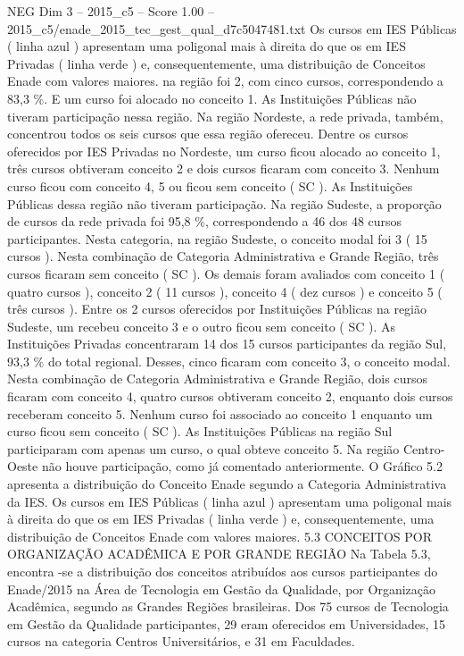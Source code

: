 \begin{textsample}{NEG Dim 3 – 2015\_c5 – Score 1.00 – 2015\_c5/enade\_2015\_tec\_gest\_qual\_d7c5047481.txt}
Os cursos em IES Públicas ( linha azul ) apresentam uma poligonal mais à direita do que os em IES Privadas ( linha verde ) e, consequentemente, uma distribuição de Conceitos Enade com valores maiores. na região foi 2, com cinco cursos, correspondendo a 83,3 \%.
E um curso foi alocado no conceito 1.
As Instituições Públicas não tiveram participação nessa região.
Na região Nordeste, a rede privada, também, concentrou todos os seis cursos que essa região ofereceu.
Dentre os cursos oferecidos por IES Privadas no Nordeste, um curso ficou alocado ao conceito 1, três cursos obtiveram conceito 2 e dois cursos ficaram com conceito 3.
Nenhum curso ficou com conceito 4, 5 ou ficou sem conceito ( SC ).
As Instituições Públicas dessa região não tiveram participação.
Na região Sudeste, a proporção de cursos da rede privada foi 95,8 \%, correspondendo a 46 dos 48 cursos participantes.
Nesta categoria, na região Sudeste, o conceito modal foi 3 ( 15 cursos ).
Nesta combinação de Categoria Administrativa e Grande Região, três cursos ficaram sem conceito ( SC ).
Os demais foram avaliados com conceito 1 ( quatro cursos ), conceito 2 ( 11 cursos ), conceito 4 ( dez cursos ) e conceito 5 ( três cursos ).
Entre os 2 cursos oferecidos por Instituições Públicas na região Sudeste, um recebeu conceito 3 e o outro ficou sem conceito ( SC ).
As Instituições Privadas concentraram 14 dos 15 cursos participantes da região Sul, 93,3 \% do total regional.
Desses, cinco ficaram com conceito 3, o conceito modal.
Nesta combinação de Categoria Administrativa e Grande Região, dois cursos ficaram com conceito 4, quatro cursos obtiveram conceito 2, enquanto dois cursos receberam conceito 5.
Nenhum curso foi associado ao conceito 1 enquanto um curso ficou sem conceito ( SC ).
As Instituições Públicas na região Sul participaram com apenas um curso, o qual obteve conceito 5.
Na região Centro-Oeste não houve participação, como já comentado anteriormente.
O Gráfico 5.2 apresenta a distribuição do Conceito Enade segundo a Categoria Administrativa da IES.
Os cursos em IES Públicas ( linha azul ) apresentam uma poligonal mais à direita do que os em IES Privadas ( linha verde ) e, consequentemente, uma distribuição de Conceitos Enade com valores maiores. 5.3 CONCEITOS POR ORGANIZAÇÃO ACADÊMICA E POR GRANDE REGIÃO Na Tabela 5.3, encontra -se a distribuição dos conceitos atribuídos aos cursos participantes do Enade/2015 na Área de Tecnologia em Gestão da Qualidade, por Organização Acadêmica, segundo as Grandes Regiões brasileiras.
Dos 75 cursos de Tecnologia em Gestão da Qualidade participantes, 29 eram oferecidos em Universidades, 15 cursos na categoria Centros Universitários, e 31 em Faculdades.

\end{textsample}

